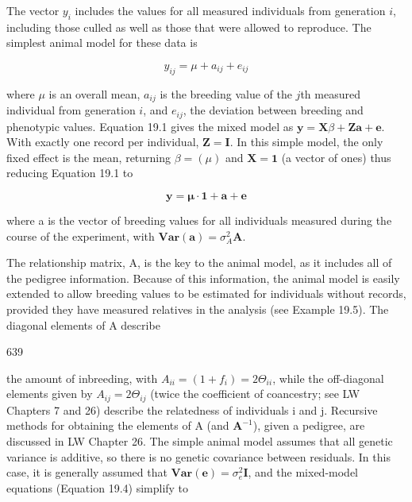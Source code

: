 \documentclass{article}
\begin{document}
The vector  $ y_i $ includes the values for all measured individuals from generation  $ i $, including those culled as well as those that were allowed to reproduce. The simplest animal model for these data is

\begin{equation}
y_{ij}=\mu+a_{ij}+e_{ij}
\tag{19.7a}
\label{eq:19_7a}
\end{equation}

where  $ \mu $ is an overall mean,  $ a_{ij} $ is the breeding value of the  $ j $th measured individual from generation  $ i $, and  $ e_{ij} $, the deviation between breeding and phenotypic values. Equation 19.1 gives the mixed model as  $ \mathbf{y} = \mathbf{X}\beta + \mathbf{Z}\mathbf{a} + \mathbf{e} $. With exactly one record per individual,  $ \mathbf{Z} = \mathbf{I} $. In this simple model, the only fixed effect is the mean, returning  $ \beta = (\mu) $ and  $ \mathbf{X} = \mathbf{1} $ (a vector of ones) thus reducing Equation 19.1 to

\begin{equation}
\mathbf{y}=\boldsymbol{\mu}\cdot\mathbf{1}+\mathbf{a}+\mathbf{e}
\tag{19.7b}
\label{eq:19_7b}
\end{equation}

where a is the vector of breeding values for all individuals measured during the course of the experiment, with  $ \mathbf{Var}(\mathbf{a}) = \sigma_A^2 \mathbf{A} $.

The relationship matrix, A, is the key to the animal model, as it includes all of the pedigree information. Because of this information, the animal model is easily extended to allow breeding values to be estimated for individuals without records, provided they have measured relatives in the analysis (see Example 19.5). The diagonal elements of A describe

639

the amount of inbreeding, with  $ A_{ii} = (1 + f_i) = 2 \Theta_{ii} $, while the off-diagonal elements given by  $ A_{ij} = 2 \Theta_{ij} $ (twice the coefficient of coancestry; see LW Chapters 7 and 26) describe the relatedness of individuals i and j. Recursive methods for obtaining the elements of A (and  $ \mathbf{A}^{-1} $), given a pedigree, are discussed in LW Chapter 26. The simple animal model assumes that all genetic variance is additive, so there is no genetic covariance between residuals. In this case, it is generally assumed that  $ \mathbf{Var}(\mathbf{e}) = \sigma_e^2 \mathbf{I} $, and the mixed-model equations (Equation 19.4) simplify to
\end{document}
